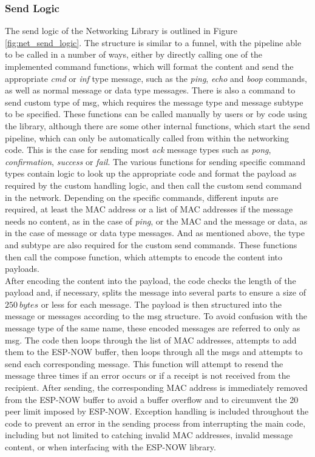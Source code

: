 \subsubsection{\label{sec:methods_send_logic}Send Logic}

The send logic of the Networking Library is outlined in Figure \ref{fig:net_send_logic}. The structure is similar to a funnel, with the pipeline able to be called in a number of ways, either by directly calling one of the implemented command functions, which will format the content and send the appropriate \textit{cmd} or \textit{inf} type message, such as the \textit{ping}, \textit{echo} and \textit{boop} commands, as well as normal message or data type messages. There is also a command to send custom type of msg, which requires the message type and message subtype to be specified. These functions can be called manually by users or by code using the library, although there are some other internal functions, which start the send pipeline, which can only be automatically called from within the networking code. This is the case for sending most \textit{ack} message types such as \textit{pong}, \textit{confirmation}, \textit{success} or \textit{fail}. The various functions for sending specific command types contain logic to look up the appropriate code and format the payload as required by the custom handling logic, and then call the custom send command in the network. Depending on the specific commands, different inputs are required, at least the MAC address or a list of MAC addresses if the message needs no content, as in the case of \textit{ping}, or the MAC and the message or data, as in the case of message or data type messages. And as mentioned above, the type and subtype are also required for the custom send commands. These functions then call the compose function, which attempts to encode the content into payloads. \\

After encoding the content into the payload, the code checks the length of the payload and, if necessary, splits the message into several parts to ensure a size of $250\ bytes$ or less for each message. The payload is then structured into the message or messages according to the msg structure. To avoid confusion with the message type of the same name, these encoded messages are referred to only as msg. The code then loops through the list of MAC addresses, attempts to add them to the ESP-NOW buffer, then loops through all the msgs and attempts to send each corresponding message. This function will attempt to resend the message three times if an error occurs or if a receipt is not received from the recipient. After sending, the corresponding MAC address is immediately removed from the ESP-NOW buffer to avoid a buffer overflow and to circumvent the 20 peer limit imposed by ESP-NOW. Exception handling is included throughout the code to prevent an error in the sending process from interrupting the main code, including but not limited to catching invalid MAC addresses, invalid message content, or when interfacing with the ESP-NOW library.

